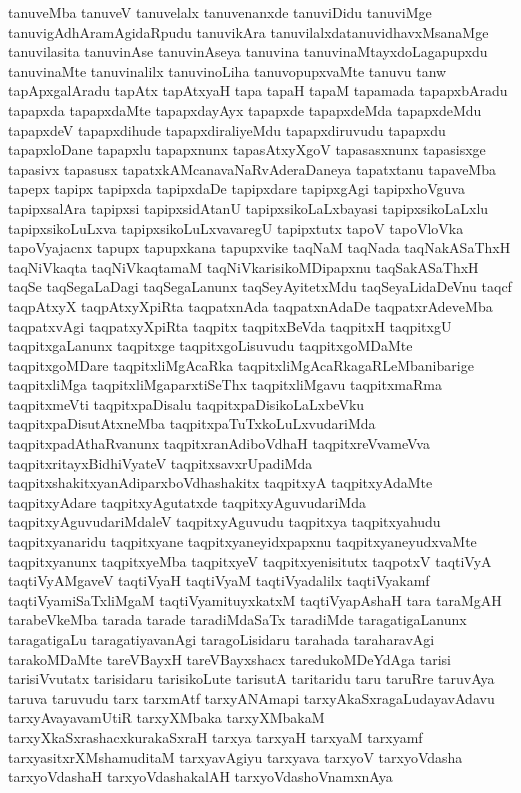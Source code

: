 {tanuveMba
tanuveV
tanuvelalx
tanuvenanxde
tanuviDidu
tanuviMge
tanuvigAdhAramAgidaRpudu
tanuvikAra
tanuvilalxdatanuvidhavxMsanaMge
tanuvilasita
tanuvinAse
tanuvinAseya
tanuvina
tanuvinaMtayxdoLagapupxdu
tanuvinaMte
tanuvinalilx
tanuvinoLiha
tanuvopupxvaMte
tanuvu
tanw
tapApxgalAradu
tapAtx
tapAtxyaH
tapa
tapaH
tapaM
tapamada
tapapxbAradu
tapapxda
tapapxdaMte
tapapxdayAyx
tapapxde
tapapxdeMda
tapapxdeMdu
tapapxdeV
tapapxdihude
tapapxdiraliyeMdu
tapapxdiruvudu
tapapxdu
tapapxloDane
tapapxlu
tapapxnunx
tapasAtxyXgoV
tapasasxnunx
tapasisxge
tapasivx
tapasusx
tapatxkAMcanavaNaRvAderaDaneya
tapatxtanu
tapaveMba
tapepx
tapipx
tapipxda
tapipxdaDe
tapipxdare
tapipxgAgi
tapipxhoVguva
tapipxsalAra
tapipxsi
tapipxsidAtanU
tapipxsikoLaLxbayasi
tapipxsikoLaLxlu
tapipxsikoLuLxva
tapipxsikoLuLxvavaregU
tapipxtutx
tapoV
tapoVloVka
tapoVyajacnx
tapupx
tapupxkana
tapupxvike
taqNaM
taqNada
taqNakASaThxH
taqNiVkaqta
taqNiVkaqtamaM
taqNiVkarisikoMDipapxnu
taqSakASaThxH
taqSe
taqSegaLaDagi
taqSegaLanunx
taqSeyAyitetxMdu
taqSeyaLidaDeVnu
taqcf
taqpAtxyX
taqpAtxyXpiRta
taqpatxnAda
taqpatxnAdaDe
taqpatxrAdeveMba
taqpatxvAgi
taqpatxyXpiRta
taqpitx
taqpitxBeVda
taqpitxH
taqpitxgU
taqpitxgaLanunx
taqpitxge
taqpitxgoLisuvudu
taqpitxgoMDaMte
taqpitxgoMDare
taqpitxliMgAcaRka
taqpitxliMgAcaRkagaRLeMbanibarige
taqpitxliMga
taqpitxliMgaparxtiSeThx
taqpitxliMgavu
taqpitxmaRma
taqpitxmeVti
taqpitxpaDisalu
taqpitxpaDisikoLaLxbeVku
taqpitxpaDisutAtxneMba
taqpitxpaTuTxkoLuLxvudariMda
taqpitxpadAthaRvanunx
taqpitxranAdiboVdhaH
taqpitxreVvameVva
taqpitxritayxBidhiVyateV
taqpitxsavxrUpadiMda
taqpitxshakitxyanAdiparxboVdhashakitx
taqpitxyA
taqpitxyAdaMte
taqpitxyAdare
taqpitxyAgutatxde
taqpitxyAguvudariMda
taqpitxyAguvudariMdaleV
taqpitxyAguvudu
taqpitxya
taqpitxyahudu
taqpitxyanaridu
taqpitxyane
taqpitxyaneyidxpapxnu
taqpitxyaneyudxvaMte
taqpitxyanunx
taqpitxyeMba
taqpitxyeV
taqpitxyenisitutx
taqpotxV
taqtiVyA
taqtiVyAMgaveV
taqtiVyaH
taqtiVyaM
taqtiVyadalilx
taqtiVyakamf
taqtiVyamiSaTxliMgaM
taqtiVyamituyxkatxM
taqtiVyapAshaH
tara
taraMgAH
tarabeVkeMba
tarada
tarade
taradiMdaSaTx
taradiMde
taragatigaLanunx
taragatigaLu
taragatiyavanAgi
taragoLisidaru
tarahada
taraharavAgi
tarakoMDaMte
tareVBayxH
tareVBayxshacx
taredukoMDeYdAga
tarisi
tarisiVvutatx
tarisidaru
tarisikoLute
tarisutA
taritaridu
taru
taruRre
taruvAya
taruva
taruvudu
tarx
tarxmAtf
tarxyANAmapi
tarxyAkaSxragaLudayavAdavu
tarxyAvayavamUtiR
tarxyXMbaka
tarxyXMbakaM
tarxyXkaSxrashacxkurakaSxraH
tarxya
tarxyaH
tarxyaM
tarxyamf
tarxyasitxrXMshamuditaM
tarxyavAgiyu
tarxyava
tarxyoV
tarxyoVdasha
tarxyoVdashaH
tarxyoVdashakalAH
tarxyoVdashoVnamxnAya
}
